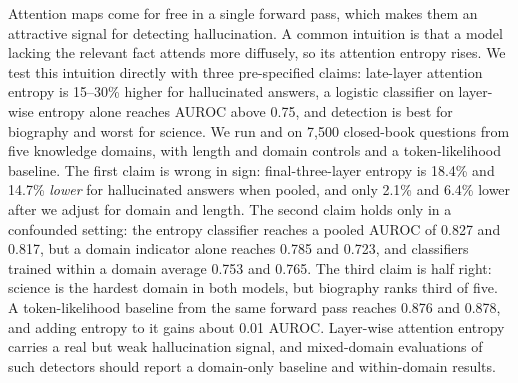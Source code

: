 Attention maps come for free in a single forward pass, which makes them an attractive signal for detecting hallucination.
A common intuition is that a model lacking the relevant fact attends more diffusely, so its attention entropy rises.
We test this intuition directly with three pre-specified claims: late-layer attention entropy is 15--30\% higher for hallucinated answers, a logistic classifier on layer-wise entropy alone reaches AUROC above 0.75, and detection is best for biography and worst for science.
We run \qwen and \llama on 7,500 closed-book questions from five knowledge domains, with length and domain controls and a token-likelihood baseline.
The first claim is wrong in sign: final-three-layer entropy is 18.4\% and 14.7\% \emph{lower} for hallucinated answers when pooled, and only 2.1\% and 6.4\% lower after we adjust for domain and length.
The second claim holds only in a confounded setting: the entropy classifier reaches a pooled AUROC of 0.827 and 0.817, but a domain indicator alone reaches 0.785 and 0.723, and classifiers trained within a domain average 0.753 and 0.765.
The third claim is half right: science is the hardest domain in both models, but biography ranks third of five.
A token-likelihood baseline from the same forward pass reaches 0.876 and 0.878, and adding entropy to it gains about 0.01 AUROC.
Layer-wise attention entropy carries a real but weak hallucination signal, and mixed-domain evaluations of such detectors should report a domain-only baseline and within-domain results.
